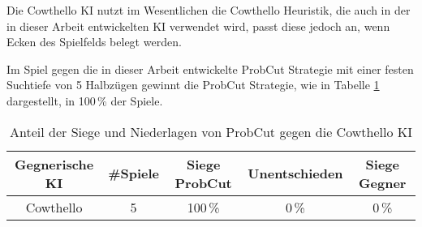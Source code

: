 Die Cowthello \ac{KI} nutzt im Wesentlichen die Cowthello Heuristik, die auch in der in dieser Arbeit entwickelten \ac{KI}
verwendet wird, passt diese jedoch an, wenn Ecken des Spielfelds belegt werden. \cite{cowthello}

Im Spiel gegen die in dieser Arbeit entwickelte ProbCut Strategie mit einer festen Suchtiefe von 5 Halbzügen gewinnt
die ProbCut Strategie, wie in Tabelle \ref{table:comp:cowthello} dargestellt, in 100\,\%  der Spiele.

\begin{table}[H]
\centering
\begin{tabular}{c|c|ccc}
\hline
Gegnerische \ac{KI} & \#Spiele & Siege ProbCut & Unentschieden & Siege Gegner \\
\hline
Cowthello & 5 & 100\,\% & 0\,\% & 0\,\% \\
\hline
\end{tabular}
\caption{Anteil der Siege und Niederlagen von ProbCut gegen die Cowthello \ac{KI}}
\label{table:comp:cowthello}
\end{table}